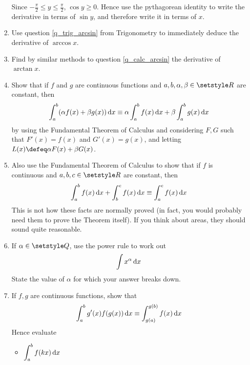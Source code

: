 \begin{enumerate}
  Since \(-\frac \pi 2 \le y \le \frac \pi 2\), \(\cos y \ge 0\). Hence use the
  pythagorean identity to write the derivative in terms of \(\sin y\), and
  therefore write it in terms of \(x\).
 \item
  Use question \ref{q_trig_arcsin} from Trigonometry to immediately deduce the
  derivative of \(\arccos x\).
 \item
  Find by similar methods to question \ref{q_calc_arcsin} the derivative of
  \(\arctan x\).
 \item
  Show that if \(f\) and \(g\) are continuous functions and
  \(a, b, \alpha, \beta \in \Reals\) are constant, then
  \begin{equation*}
   \integ[a]<b>{(\alpha f(x) + \beta g(x))}{x} \equiv
   \alpha \integ[a]<b>{f(x)}{x} +
   \beta  \integ[a]<b>{g(x)}{x}
  \end{equation*}
  by using the Fundamental Theorem of Calculus and considering \(F, G\) such
  that \(F'(x) = f(x)\) and \(G'(x) = g(x)\), and letting
  \(L(x) \defeq \alpha F(x) + \beta G(x)\).
 \item
  Also use the Fundamental Theorem of Calculus to show that if \(f\) is
  continuous and \(a, b, c \in \Reals\) are constant, then
  \begin{equation*}
   \integ[a]<b>{f(x)}{x} + \integ[b]<c>{f(x)}{x} \equiv
   \integ[a]<c>{f(x)}{x}
  \end{equation*}
  This is not how these facts are normally proved (in fact, you would probably
  need them to prove the Theorem itself). If you think about areas, they should
  sound quite reasonable.
 \item \label{q_calc_int_pwr}
  If \(\alpha \in \Rationals\), use the power rule to work out
  \begin{equation*}
   \integ{x^\alpha}{x}
  \end{equation*}
  State the value of \(\alpha\) for which your answer breaks down.
 \item
  If \(f, g\) are continuous functions, show that
  \begin{equation*}
   \integ[a]<b>{g'(x) f(g(x))}{x} \equiv
   \integ[g(a)]<g(b)>{f(x)}{x}
  \end{equation*}
  Hence evaluate
  \begin{itemize}
   \item \(\displaystyle
    \integ[a]<b>{f(kx)}{x}
    \)


\end{itemize}
\end{enumerate}
